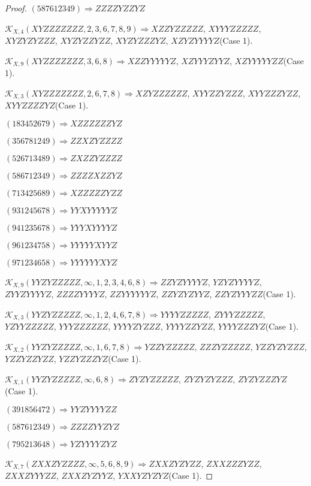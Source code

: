 \documentclass[12pt]{article}
\theoremstyle{plain}
\theoremstyle{definition}
\theoremstyle{remark}
\newcommand{\fancy}[1]{\mathcal{#1}}
\def\K{\fancy{K}}
\begin{document}
\begin{proof}
	$(5 8 7 6 1 2 3 4 9)\Rightarrow ZZZZYZZYZ$
	
	
	
	$\K_{X,4}(XYZZZZZZZ,2, 3, 6, 7, 8, 9)\Rightarrow $$XZZYZZZZZ$, $XYYYZZZZZ$, $XYZYZYZZZ$, $XYZYZZYZZ$, $XYZYZZZYZ$, $XZYZYYYYZ$(Case 1).
	
	$\K_{X,9}(XYZZZZZZZ,3, 6, 8)\Rightarrow $$XZZYYYYYZ$, $XZYYYZYYZ$, $XZYYYYYZZ$(Case 1).
	
	$\K_{X,3}(XYZZZZZZZ,2, 6, 7, 8)\Rightarrow $$XZYZZZZZZ$, $XYYZZYZZZ$, $XYYZZZYZZ$, $XYYZZZZYZ$(Case 1).
	
	
	
	$(1 8 3 4 5 2 6 7 9)\Rightarrow XZZZZZZYZ$
	
	$(3 5 6 7 8 1 2 4 9)\Rightarrow ZZXZYZZZZ$
	
	$(5 2 6 7 1 3 4 8 9)\Rightarrow ZXZZYZZZZ$
	
	$(5 8 6 7 1 2 3 4 9)\Rightarrow ZZZZXZZYZ$
	
	$(7 1 3 4 2 5 6 8 9)\Rightarrow XZZZZZYZZ$
	
	$(9 3 1 2 4 5 6 7 8)\Rightarrow YYXYYYYYZ$
	
	$(9 4 1 2 3 5 6 7 8)\Rightarrow YYYXYYYYZ$
	
	$(9 6 1 2 3 4 7 5 8)\Rightarrow YYYYYXYYZ$
	
	$(9 7 1 2 3 4 6 5 8)\Rightarrow YYYYYYXYZ$
	
	
	
	$\K_{X,9}(YYZYZZZZZ,\infty,1, 2, 3, 4, 6, 8)\Rightarrow $$ZZYZYYYYZ$, $YZYZYYYYZ$, $ZYYZYYYYZ$, $ZZZZYYYYZ$, $ZZYYYYYYZ$, $ZZYZYZYYZ$, $ZZYZYYYZZ$(Case 1).
	
	$\K_{X,3}(YYZYZZZZZ,\infty,1, 2, 4, 6, 7, 8)\Rightarrow $$YYYYZZZZZ$, $ZYYYZZZZZ$, $YZYYZZZZZ$, $YYYZZZZZZ$, $YYYYZYZZZ$, $YYYYZZYZZ$, $YYYYZZZYZ$(Case 1).
	
	$\K_{X,2}(YYZYZZZZZ,\infty,1, 6, 7, 8)\Rightarrow $$YZZYZZZZZ$, $ZZZYZZZZZ$, $YZZYZYZZZ$, $YZZYZZYZZ$, $YZZYZZZYZ$(Case 1).
	
	$\K_{X,1}(YYZYZZZZZ,\infty,6, 8)\Rightarrow $$ZYZYZZZZZ$, $ZYZYZYZZZ$, $ZYZYZZZYZ$(Case 1).
	
	
	
	$(3 9 1 8 5 6 4 7 2)\Rightarrow YYZYYYYZZ$
	
	$(5 8 7 6 1 2 3 4 9)\Rightarrow ZZZZYYZYZ$
	
	$(7 9 5 2 1 3 6 4 8)\Rightarrow YZYYYYZYZ$
	
	
	
	$\K_{X,7}(ZXXZYZZZZ,\infty,5, 6, 8, 9)\Rightarrow $$ZXXZYZYZZ$, $ZXXZZZYZZ$, $ZXXZYYYZZ$, $ZXXZYZYYZ$, $YXXYZYZYZ$(Case 1).
	

\end{proof}
\end{document}
